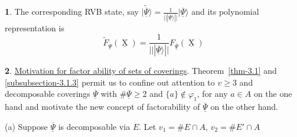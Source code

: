 \documentclass[a4paper,12pt]{article}
\DeclareMathOperator{\x}{\mathrm{X}}
\theoremstyle{definition}
\theoremstyle{underlinethm}
\theoremstyle{underline}
\newtheorem{subsubsec}{}[subsection]
\begin{document}
\begin{subsubsec}
The corresponding RVB state, say $\widetilde{| \underline{\overline{\Psi}} \rangle} = \frac{1}{|| | \underline{\overline{\Psi}} \rangle||} | \underline{\overline{\Psi}} \rangle$ and its polynomial representation is 
\begin{equation*}
\widetilde{F}_{\underline{\overline{\Psi}}} (\underline{\x}) = \frac{1}{|| | \underline{\overline{\Psi}} \rangle||} F_{\underline{\overline{\Psi}}}(\underline{\x})\tag{3.17}
\end{equation*}

\end{subsubsec}

\begin{subsubsec}\label{subsubsection-3.1.5}
\underline{Motivation for factor ability of sets of coverings}. Theorem~\ref{thm-3.1} and \ref{subsubsection-3.1.3} permit us to confine out attention to $v\geq 3$ and decomposable coverings $\underline{\overline{\Psi}}$ with $\# \underline{\overline{\Psi}} \geq 2$ and $\{a\} \notin \varphi_{1}$, for any $a \in A$ on the one hand and motivate the new concept of factorability of $\underline{\overline{\Psi}}$ on the other hand.

(a) Suppose $\underline{\overline{\Psi}}$ is decomposable via $E$. Let $v_{1}= \# E \cap A$, $v_{2} = \# E' \cap A$


\end{subsubsec}
\end{document}
